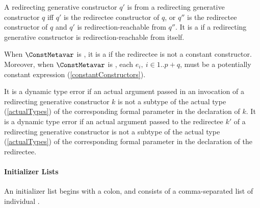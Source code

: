 \documentclass[makeidx]{article}
\begin{document}

\LMHash{}%
A redirecting generative constructor $q'$ is 
from a redirecting generative constructor $q$ if{}f
$q'$ is the redirectee constructor of $q$,
or $q''$ is the redirectee constructor of $q$
and $q'$ is redirection-reachable from $q''$.
It is a  if a redirecting generative constructor
is redirection-reachable from itself.

\LMHash{}%
When $\ConstMetavar$ is \CONST,
it is a
 if the redirectee is not a constant constructor.
Moreover, when $\ConstMetavar$ is \CONST, each
$e_i,\ i \in 1 .. p+q$,
must be a potentially constant expression (\ref{constantConstructors}).

\LMHash{}%
It is a dynamic type error if an actual argument passed
in an invocation of a redirecting generative constructor $k$
is not a subtype of the actual type (\ref{actualTypes})
of the corresponding formal parameter in the declaration of $k$.
It is a dynamic type error if an actual argument passed
to the redirectee $k'$ of a redirecting generative constructor
is not a subtype of the actual type
(\ref{actualTypes})
of the corresponding formal parameter in the declaration of the redirectee.


\paragraph{Initializer Lists}

\LMHash{}%
An initializer list begins with a colon,
and consists of a comma-separated list of individual .

\end{document}
